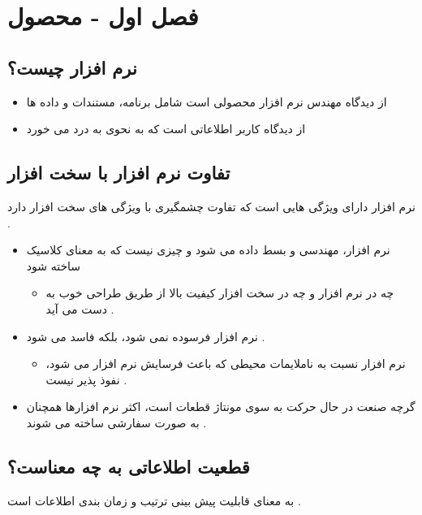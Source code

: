 \documentclass{article}
\begin{document}
\tableofcontents

\newpage

\section{فصل اول - محصول}

\subsection{نرم افزار چیست؟}

\begin{itemize}
	\item از دیدگاه مهندس نرم افزار محصولی است شامل برنامه، مستندات و داده ها
	\item از دیدگاه کاربر اطلاعاتی است که به نحوی به درد می خورد
\end{itemize}



\subsection{تفاوت نرم افزار با سخت افزار}
نرم افزار دارای ویژگی هایی است که تفاوت چشمگیری با ویژگی های سخت افزار دارد .

\begin{itemize}
	\item نرم افزار، مهندسی و بسط داده می شود و چیزی نیست که به معنای کلاسیک ساخته شود
	\begin{itemize}
		\item چه در نرم افزار و چه در سخت افزار کیفیت بالا از طریق طراحی خوب به دست می آید .
	\end{itemize}
	\item نرم افزار فرسوده نمی شود، بلکه فاسد می شود .
	\begin{itemize}
		\item نرم افزار نسبت به ناملایمات محیطی که باعث فرسایش نرم افزار می شود، نفوذ پذیر نیست .
	\end{itemize}
	\item گرچه صنعت در حال حرکت به سوی مونتاژ قطعات است، اکثر نرم افزارها همچنان به صورت سفارشی ساخته می شوند .
\end{itemize}


\subsection{قطعیت اطلاعاتی به چه معناست؟}
به معنای قابلیت پیش بینی ترتیب و زمان بندی اطلاعات است .
\end{document}
